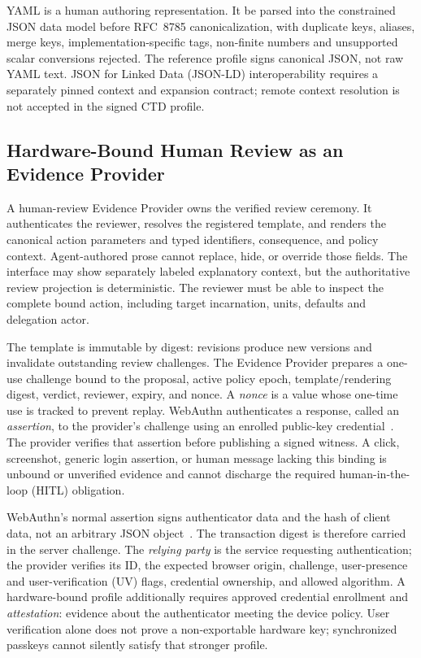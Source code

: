 YAML is a human authoring representation. It  be parsed into the constrained JSON data model before RFC~8785 canonicalization, with duplicate keys, aliases, merge keys, implementation-specific tags, non-finite numbers and unsupported scalar conversions rejected. The reference profile signs canonical JSON, not raw YAML text. JSON for Linked Data (JSON-LD) interoperability requires a separately pinned context and expansion contract; remote context resolution is not accepted in the signed CTD profile.

\subsection{Hardware-Bound Human Review as an Evidence Provider}
\label{sec:hitl-provider}
A human-review Evidence Provider owns the verified review ceremony. It authenticates the reviewer, resolves the registered template, and renders the canonical action parameters and typed identifiers, consequence, and policy context. Agent-authored prose cannot replace, hide, or override those fields. The interface may show separately labeled explanatory context, but the authoritative review projection is deterministic. The reviewer must be able to inspect the complete bound action, including target incarnation, units, defaults and delegation actor.

The template is immutable by digest: revisions produce new versions and invalidate outstanding review challenges. The Evidence Provider prepares a one-use challenge bound to the proposal, active policy epoch, template/rendering digest, verdict, reviewer, expiry, and nonce. A \emph{nonce} is a value whose one-time use is tracked to prevent replay. WebAuthn authenticates a response, called an \emph{assertion}, to the provider's challenge using an enrolled public-key credential~\cite{webauthn3}. The provider verifies that assertion before publishing a signed witness. A click, screenshot, generic login assertion, or human message lacking this binding is unbound or unverified evidence and cannot discharge the required human-in-the-loop (HITL) obligation.

WebAuthn's normal assertion signs authenticator data and the hash of client data, not an arbitrary JSON object~\cite{webauthn3}. The transaction digest is therefore carried in the server challenge. The \emph{relying party} is the service requesting authentication; the provider verifies its ID, the expected browser origin, challenge, user-presence and user-verification (UV) flags, credential ownership, and allowed algorithm. A hardware-bound profile additionally requires approved credential enrollment and \emph{attestation}: evidence about the authenticator meeting the device policy. User verification alone does not prove a non-exportable hardware key; synchronized passkeys cannot silently satisfy that stronger profile.
